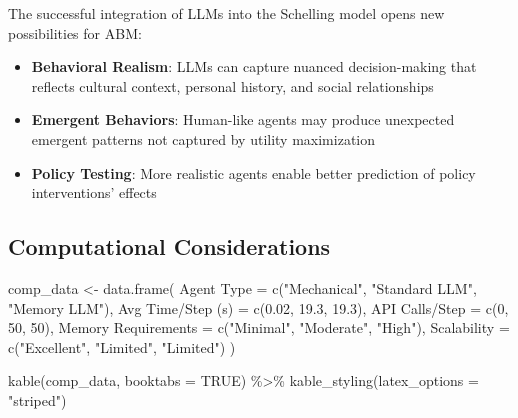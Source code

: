 \documentclass[
  11pt,
]{article}
\newenvironment{Shaded}{\begin{snugshade}}{\end{snugshade}}
\newcommand{\AttributeTok}[1]{\textcolor[rgb]{0.40,0.45,0.13}{#1}}
\newcommand{\ConstantTok}[1]{\textcolor[rgb]{0.56,0.35,0.01}{#1}}
\newcommand{\DecValTok}[1]{\textcolor[rgb]{0.68,0.00,0.00}{#1}}
\newcommand{\FloatTok}[1]{\textcolor[rgb]{0.68,0.00,0.00}{#1}}
\newcommand{\FunctionTok}[1]{\textcolor[rgb]{0.28,0.35,0.67}{#1}}
\newcommand{\NormalTok}[1]{\textcolor[rgb]{0.00,0.23,0.31}{#1}}
\newcommand{\OtherTok}[1]{\textcolor[rgb]{0.00,0.23,0.31}{#1}}
\newcommand{\SpecialCharTok}[1]{\textcolor[rgb]{0.37,0.37,0.37}{#1}}
\newcommand{\StringTok}[1]{\textcolor[rgb]{0.13,0.47,0.30}{#1}}
\providecommand{\tightlist}{%
  \setlength{\itemsep}{0pt}\setlength{\parskip}{0pt}}\usepackage{longtable,booktabs,array}
\begin{document}
The successful integration of LLMs into the Schelling model opens new
possibilities for ABM:

\begin{itemize}
\tightlist
\item
  \textbf{Behavioral Realism}: LLMs can capture nuanced decision-making
  that reflects cultural context, personal history, and social
  relationships
\item
  \textbf{Emergent Behaviors}: Human-like agents may produce unexpected
  emergent patterns not captured by utility maximization
\item
  \textbf{Policy Testing}: More realistic agents enable better
  prediction of policy interventions' effects
\end{itemize}

\subsection{Computational
Considerations}\label{computational-considerations}

\begin{Shaded}
\begin{Highlighting}[]
\NormalTok{comp\_data }\OtherTok{\textless{}{-}} \FunctionTok{data.frame}\NormalTok{(}
  \StringTok{\textasciigrave{}}\AttributeTok{Agent Type}\StringTok{\textasciigrave{}} \OtherTok{=} \FunctionTok{c}\NormalTok{(}\StringTok{"Mechanical"}\NormalTok{, }\StringTok{"Standard LLM"}\NormalTok{, }\StringTok{"Memory LLM"}\NormalTok{),}
  \StringTok{\textasciigrave{}}\AttributeTok{Avg Time/Step (s)}\StringTok{\textasciigrave{}} \OtherTok{=} \FunctionTok{c}\NormalTok{(}\FloatTok{0.02}\NormalTok{, }\FloatTok{19.3}\NormalTok{, }\FloatTok{19.3}\NormalTok{),}
  \StringTok{\textasciigrave{}}\AttributeTok{API Calls/Step}\StringTok{\textasciigrave{}} \OtherTok{=} \FunctionTok{c}\NormalTok{(}\DecValTok{0}\NormalTok{, }\DecValTok{50}\NormalTok{, }\DecValTok{50}\NormalTok{),}
  \StringTok{\textasciigrave{}}\AttributeTok{Memory Requirements}\StringTok{\textasciigrave{}} \OtherTok{=} \FunctionTok{c}\NormalTok{(}\StringTok{"Minimal"}\NormalTok{, }\StringTok{"Moderate"}\NormalTok{, }\StringTok{"High"}\NormalTok{),}
  \StringTok{\textasciigrave{}}\AttributeTok{Scalability}\StringTok{\textasciigrave{}} \OtherTok{=} \FunctionTok{c}\NormalTok{(}\StringTok{"Excellent"}\NormalTok{, }\StringTok{"Limited"}\NormalTok{, }\StringTok{"Limited"}\NormalTok{)}
\NormalTok{)}

\FunctionTok{kable}\NormalTok{(comp\_data, }\AttributeTok{booktabs =} \ConstantTok{TRUE}\NormalTok{) }\SpecialCharTok{\%\textgreater{}\%}
  \FunctionTok{kable\_styling}\NormalTok{(}\AttributeTok{latex\_options =} \StringTok{"striped"}\NormalTok{)}
\end{Highlighting}
\end{Shaded}
\end{document}
